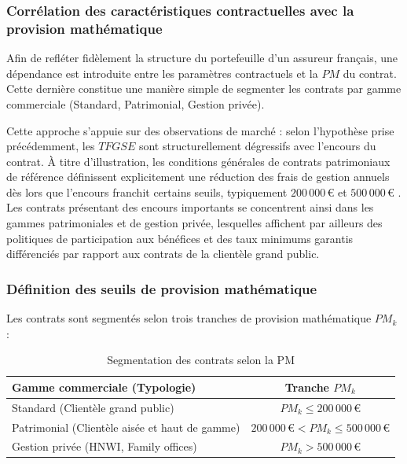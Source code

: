 \subsubsection*{Corrélation des caractéristiques contractuelles avec la provision mathématique}

Afin de refléter fidèlement la structure du portefeuille d'un assureur français, une dépendance est introduite entre les paramètres contractuels et la $PM$ du contrat. Cette dernière constitue une manière simple de segmenter les contrats par gamme commerciale (Standard, Patrimonial, Gestion privée).

Cette approche s'appuie sur des observations de marché : selon l'hypothèse prise précédemment, les $TFGSE$ sont structurellement dégressifs avec l'encours du contrat. À titre d'illustration, les conditions générales de contrats patrimoniaux de référence définissent explicitement une réduction des frais de gestion annuels dès lors que l'encours franchit certains seuils, typiquement $200\,000$\,\euro{} et $500\,000$\,\euro{} \cite{cgs_cachemire, faUC2024}. Les contrats présentant des encours importants se concentrent ainsi dans les gammes patrimoniales et de gestion privée, lesquelles affichent par ailleurs des politiques de participation aux bénéfices et des taux minimums garantis différenciés par rapport aux contrats de la clientèle grand public.

\subsubsection*{Définition des seuils de provision mathématique}

Les contrats sont segmentés selon trois tranches de provision mathématique $PM_k$ :
\begin{table}[h!]
  \centering
  \caption{Segmentation des contrats selon la PM}
  \label{tab:seuils_pm}
  \begin{tabular}{lc}
    \toprule
    \textbf{Gamme commerciale (Typologie)} & \textbf{Tranche $PM_k$} \\
    \midrule
    Standard (Clientèle grand public) & $PM_k \leq 200\,000$\,\euro \\
    Patrimonial (Clientèle aisée et haut de gamme) & $200\,000$\,\euro $< PM_k \leq 500\,000$\,\euro \\
    Gestion privée (HNWI\footnotemark, Family offices\footnotemark) & $PM_k > 500\,000$\,\euro \\
    \bottomrule
  \end{tabular}
\end{table}
\addtocounter{footnote}{-1}


